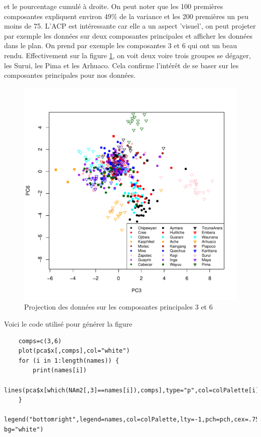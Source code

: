 \documentclass[12pt,a4paper]{article}
\begin{document}
et le pourcentage cumulé à droite. On peut noter que les 100 premières
composantes expliquent environ 49\% de la variance et les 200 premières un peu
moins de 75.  L'ACP est intéressante car elle a un aspect 'visuel', on peut projeter
par exemple les données sur deux composantes principales et afficher les données dans 
le plan. On prend par exemple les composantes 3 et 6 qui ont un beau rendu. Effectivement
sur la figure \ref{fig:acp_pc36}, on voit deux voire trois groupes se dégager, les Surui, les
Pima et les Arhuaco. Cela confirme l'intérêt de se baser sur les composantes principales pour nos
données.
\begin{figure}[h!]
	\begin{center}
		\includegraphics[scale=0.7]{figures/pc36.pdf}
		\caption{Projection des données sur les composantes principales 3 et 6}
		\label{fig:acp_pc36}
	\end{center}
\end{figure}

Voici le code utilisé pour générer la figure
\begin{lstlisting}
	comps=c(3,6)
	plot(pca$x[,comps],col="white")
	for (i in 1:length(names)) {
		print(names[i])
		lines(pca$x[which(NAm2[,3]==names[i]),comps],type="p",col=colPalette[i],pch=pch[i])
	}
	legend("bottomright",legend=names,col=colPalette,lty=-1,pch=pch,cex=.75,ncol=3,lwd=2, bg="white")
\end{lstlisting}
\end{document}
